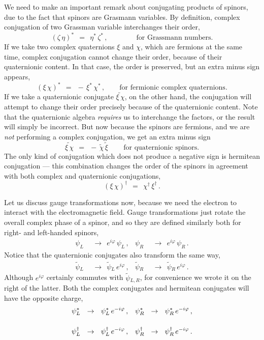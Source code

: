 \documentclass[epsfig,12pt]{article}
\newcommand{\wt}{\widetilde}
\begin{document}
	We need to make an important remark about conjugating products of spinors,
	due to the fact that spinors are Grasmann variables.
	By definition, complex conjugation of two Grassman variable interchanges their order,
\begin{equation}
	(\zeta\, \eta)^*	~~=~~	\eta^*\, \zeta^*\,,\qquad\qquad \text{for Grassmann numbers.}
\end{equation}
	If we take two complex quaternions $ \xi $ and $ \chi $, which are fermions at the same time,
	complex conjugation cannot change their order, because of their quaternionic content.
	In that case, the order is preserved, but an extra minus sign appears,
\begin{equation}
	(\xi\, \chi)^*		~~=~~	-\, \xi^*\, \chi^*\,,\qquad \text{for fermionic complex quaternions.}
\end{equation}
	If we take a quaternionic conjugate $ \wt{\xi\, \chi} $, on the other hand, 
	the conjugation will attempt to change their order precisely because of the quaternionic content.
	Note that the quaternionic algebra \emph{requires} us to interchange the factors, or
	the result will simply be incorrect.
	But now because the spinors are fermions, and we are \emph{not} performing a
	complex conjugation, we get an extra minus sign
\begin{equation}
	\wt{\xi\, \chi}		~~=~~	-\, \wt\chi\, \wt\xi\,\qquad \text{for quaternionic spinors.}
\end{equation}
	The only kind of conjugation which does not produce a negative sign is hermitean
	conjugation --- this combination changes the order of the spinors in agreement with
	both complex and quaternionic conjugations,
\begin{equation}
	(\xi\, \chi)^\dag	~~=~~	\chi^\dag\, \xi^\dag\,.
\end{equation}

	Let us discuss gauge transformations now, because we need the electron to interact with the electromagnetic field.
	Gauge transformations just rotate the overall complex phase of a spinor, and so they are defined
	similarly both for right- and left-handed spinors,
\begin{align}
	\psi_L		& ~~\to~~		e^{i\varphi}\,\psi_L\,,
	&
	\psi_R		& ~~\to~~		e^{i\varphi}\,\psi_R\,.
\end{align}
	Notice that the quaternionic conjugates also transform the same way,
\begin{align}
	\wt\psi{}_L		& ~~\to~~		\wt\psi{}_L\,e^{i\varphi}\,,
	&
	\wt\psi{}_R		& ~~\to~~		\wt\psi{}_R\,e^{i\varphi}\,.
\end{align}
	Although $ e^{i\varphi} $ certainly commutes with $ \wt\psi{}_{L,R} $,
	for convenience we wrote it on the right of the latter.
	Both the complex conjugates and hermitean conjugates will have the opposite charge,
\begin{align}
%
\notag
	\psi_L^*		& ~~\to~~		\psi_L^*\,e^{-i\varphi}\,,
	&
	\psi_R^*		& ~~\to~~		\psi_R^*\,e^{-i\varphi}\,,
	\\[4mm]
%
	\psi_L^\dag		& ~~\to~~		\psi_L^\dag\,e^{-i\varphi}\,,
	&
	\psi_R^\dag		& ~~\to~~		\psi_R^\dag\,e^{-i\varphi}\,.
\end{align}
\end{document}
